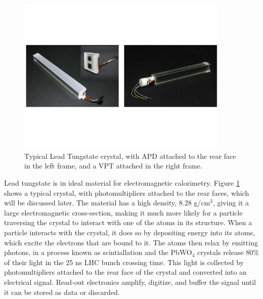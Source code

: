 \begin{figure}[h]
   \centering
  \includegraphics[width=0.9\textwidth]{Figures/CMS_Diagrams/ECAL__Xtal.pdf}
  \caption{Typical Lead Tungstate crystal, with APD attached to the
    rear face in the left frame, and a VPT attached in the right
    frame. } \label{fig:ecal_xtals}
\end{figure}

\par Lead tungstate is in ideal material for electromagnetic
calorimetry.  Figure \ref{fig:ecal_xtals} shows a typical crystal,
with photomultipliers attached to the rear faces, which will be
discussed later.  The material has a high density, 8.28 g/cm$^{3}$, giving it a
large electromagnetic cross-section, making it much more likely for a
particle traversing the crystal to interact with one of the atoms in
its structure.  When a particle interacts with the crystal, it does so
by depositing energy into its atoms, which excite the electrons that
are bound to it.  The atoms then relax by emitting photons, in a
process known as scintiallation and the PbWO$_{4}$ crystals release
80$\%$ of their light in the 25 ns LHC bunch crossing time.  This
light is collected by photomultipliers attached to the rear face of
the crystal and converted into an electrical signal.  Read-out
electronics amplify, digitize, and buffer the signal until it can be
stored as data or discarded.  

